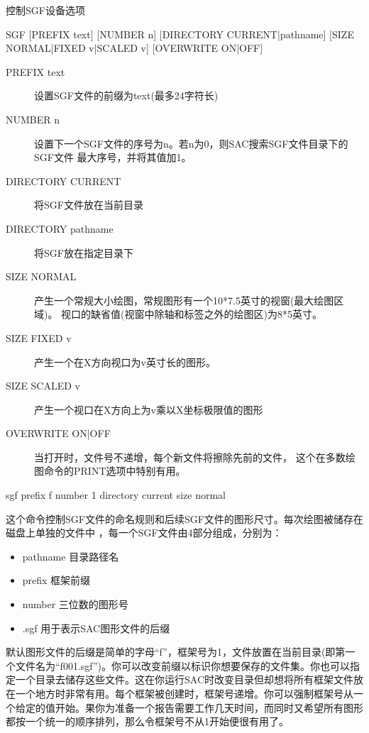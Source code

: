 \label{cmd:sgf}

控制SGF设备选项

\begin{SACSTX}
SGF [PREFIX text] [NUMBER n] [DIRECTORY CURRENT|pathname]
    [SIZE NORMAL|FIXED v|SCALED v] [OVERWRITE ON|OFF]
\end{SACSTX}

\begin{description}
\item [PREFIX text] 设置SGF文件的前缀为text(最多24字符长)
\item [NUMBER n] 设置下一个SGF文件的序号为n。若n为0，则SAC搜索SGF文件目录下的SGF文件
    最大序号，并将其值加1。
\item [DIRECTORY CURRENT] 将SGF文件放在当前目录
\item [DIRECTORY pathname] 将SGF放在指定目录下
\item [SIZE NORMAL] 产生一个常规大小绘图，常规图形有一个10*7.5英寸的视窗(最大绘图区域)。
    视口的缺省值(视窗中除轴和标签之外的绘图区)为8*5英寸。
\item [SIZE FIXED v] 产生一个在X方向视口为v英寸长的图形。
\item [SIZE SCALED v] 产生一个视口在X方向上为v乘以X坐标极限值的图形
\item [OVERWRITE ON|OFF] 当打开时，文件号不递增，每个新文件将擦除先前的文件，
    这个在多数绘图命令的PRINT选项中特别有用。
\end{description}

\begin{SACDFT}
sgf prefix f number 1 directory current size normal
\end{SACDFT}

这个命令控制SGF文件的命名规则和后续SGF文件的图形尺寸。每次绘图被储存在磁盘上单独的文件中
，每一个SGF文件由4部分组成，分别为：
\begin{itemize}
\item pathname 目录路径名
\item prefix 框架前缀
\item number 三位数的图形号
\item .sgf 用于表示SAC图形文件的后缀
\end{itemize}

默认图形文件的后缀是简单的字母``f''，框架号为1，文件放置在当前目录(即第一个文件名为``f001.sgf'')。你可以改变前缀以标识你想要保存的文件集。你也可以指定一个目录去储存这些文件。这在你运行SAC时改变目录但却想将所有框架文件放在一个地方时非常有用。每个框架被创建时，框架号递增。你可以强制框架号从一个给定的值开始。果你为准备一个报告需要工作几天时间，而同时又希望所有图形都按一个统一的顺序排列，那么令框架号不从1开始便很有用了。

